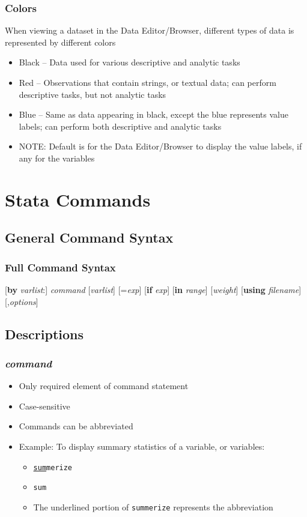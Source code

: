 \documentclass{beamer}
\begin{document}
\begin{frame}
	\frametitle{Colors}
		When viewing a dataset in the Data Editor/Browser, different types of data is represented by different colors
		\begin{itemize}
			\item Black -- Data used for various descriptive and analytic tasks
			\item Red -- Observations that contain strings, or textual data; can perform descriptive tasks, but not analytic tasks
			\item Blue -- Same as data appearing in black, except the blue represents value labels; can perform both descriptive and analytic tasks
			\item NOTE: Default is for the Data Editor/Browser to display the value labels, if any for the variables
		\end{itemize}
\end{frame}

\section{Stata Commands}
\subsection{General Command Syntax}

\begin{frame}
	\frametitle{Full Command Syntax}
		{\tiny [\textbf{by} \textit{varlist}:] \textit{command} [\textit{varlist}] [=\textit{exp}] [\textbf{if} \textit{exp}] [\textbf{in} \textit{range}] [\textit{weight}] [\textbf{using} \textit{filename}] [,\textit{options}]}
\end{frame}

\subsection{Descriptions}

\begin{frame}
	\frametitle{\textit{command}}
		\begin{itemize}
			\item Only required element of command statement
			\item Case-sensitive
			\item Commands can be abbreviated
			\item Example: To display summary statistics of a variable, or variables:
			\begin{itemize}
				\item \texttt{\underline{sum}merize}
				\item \texttt{sum}
				\item The underlined portion of \texttt{summerize} represents the abbreviation
			\end{itemize}
		\end{itemize}
\end{frame}
\end{document}
